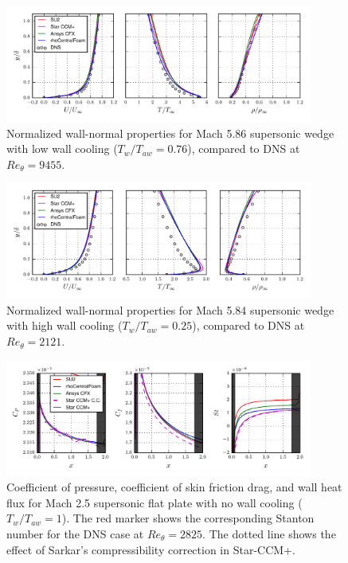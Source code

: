 \documentclass[journal ]{new-aiaa}
\begin{document}
\begin{figure}[h]
\centering
  \includegraphics[width=0.9\textwidth]{figs/Plate_RANS6AD_Comp_new.pdf}
  \caption{Normalized wall-normal properties for Mach 5.86 supersonic wedge with low wall cooling ($T_w/T_{aw} = 0.76$), compared to DNS at $Re_\theta = 9455$.}
  \label{fig:Plate_RANS6AD}
\end{figure}

\begin{figure}[h]
\centering
  \includegraphics[width=0.9\textwidth]{figs/Plate_RANS6_Comp_new.pdf}
  \caption{Normalized wall-normal properties for Mach 5.84 supersonic wedge with high wall cooling ($T_w/T_{aw} = 0.25$), compared to DNS at $Re_\theta = 2121$.}
  \label{fig:Plate_RANS6}
\end{figure}

\begin{figure}
\centering
  \includegraphics[width=0.9\textwidth]{figs/Plate_RANS2_Cd_new.pdf}
  \caption{Coefficient of pressure, coefficient of skin friction drag, and wall heat flux for Mach 2.5 supersonic flat plate with no wall cooling ($T_w/T_{aw} = 1$). The red marker shows the corresponding Stanton number for the DNS case at $Re_\theta = 2825$. The dotted line shows the effect of Sarkar's compressibility correction in Star-CCM+.}
  \label{fig:Plate_RANS2_Cd}
\end{figure}
\end{document}
